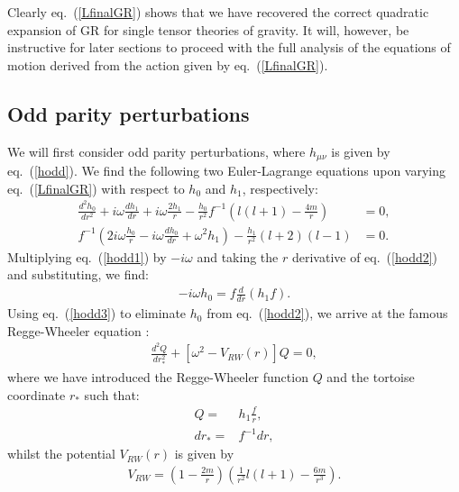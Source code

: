 \documentclass[10pt,twocolumn,preprintnumbers,amsmath,amssymb,nofootinbib
,superscriptaddress]{revtex4-1}
\begin{document}
Clearly eq.~(\ref{LfinalGR}) shows that we have recovered the correct quadratic expansion of GR for single tensor theories of gravity. It will, however, be instructive for later sections to proceed with the full analysis of the equations of motion derived from the action given by eq.~(\ref{LfinalGR}). 

\subsection{Odd parity perturbations}
We will first consider odd parity perturbations, where $h_{\mu\nu}$ is given by eq.~(\ref{hodd}). We find the following two Euler-Lagrange equations upon varying eq.~(\ref{LfinalGR}) with respect to $h_0$ and $h_1$, respectively:
\begin{align}
\frac{d^2h_0}{dr^2}+i\omega\frac{dh_1}{d r}+i\omega\frac{2h_1}{r}-\frac{h_0}{r^2}f^{-1}\left(l(l+1)-\frac{4m}{r}\right)&=0,\label{hodd1}\\
f^{-1}\left(2i\omega\frac{h_0}{r}-i\omega\frac{d h_0}{d r}+\omega^2h_1\right)-\frac{h_1}{r^2}(l+2)(l-1)&=0\label{hodd2}.
\end{align}
Multiplying eq.~(\ref{hodd1}) by $-i\omega$ and taking the $r$ derivative of eq.~(\ref{hodd2}) and substituting, we find:
\begin{align}
-i\omega h_0=f\frac{d}{d r}\left(h_1f\right)\label{hodd3}.
\end{align}
Using eq.~(\ref{hodd3}) to eliminate $h_0$ from eq.~(\ref{hodd2}), we arrive at the famous Regge-Wheeler equation \cite{Regge:1957td}:
\begin{align}
\frac{d^2 Q}{d r_\ast^2}+\left[\omega^2-V_{RW}(r)\right]Q=0,\label{reggewheeler}
\end{align}
where we have introduced the Regge-Wheeler function $Q$ and the tortoise coordinate $r_\ast$ \cite{Regge:1957td} such that:
\begin{align}
 Q=&h_1\frac{f}{r}\label{rwfunction},\\
 dr_\ast=&f^{-1}dr\label{tortoise},
\end{align} 
whilst the potential $V_{RW}(r)$ is given by
\begin{align}
V_{RW}=\left(1-\frac{2m}{r}\right)\left(\frac{1}{r^2}l(l+1)-\frac{6m}{r^3}\right).\label{Vreggewheeler}
\end{align}
\end{document}
